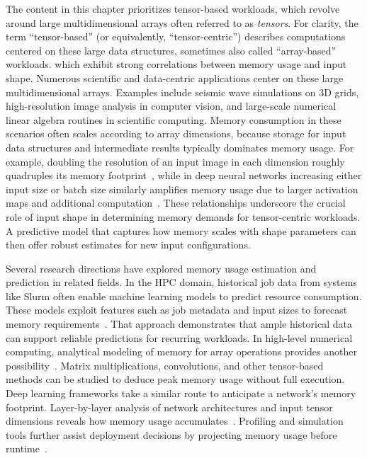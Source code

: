 The content in this chapter prioritizes tensor-based workloads, which revolve around large multidimensional arrays often referred to as \textit{tensors}.
For clarity, the term “tensor-based” (or equivalently, “tensor-centric”) describes computations centered on these large data structures, sometimes also called “array-based” workloads.
which exhibit strong correlations between memory usage and input shape.
Numerous scientific and data-centric applications center on these large multidimensional arrays.
Examples include seismic wave simulations on \ac{3D} grids, high-resolution image analysis in computer vision, and large-scale numerical linear algebra routines in scientific computing.
Memory consumption in these scenarios often scales according to array dimensions, because storage for input data structures and intermediate results typically dominates memory usage.
For example, doubling the resolution of an input image in each dimension roughly quadruples its memory footprint~\cite{stackoverflow_memory_inv}, while in deep neural networks increasing either input size or batch size similarly amplifies memory usage due to larger activation maps and additional computation~\cite{dell_3dunet_memory}.
These relationships underscore the crucial role of input shape in determining memory demands for tensor-centric workloads.
A predictive model that captures how memory scales with shape parameters can then offer robust estimates for new input configurations.

Several research directions have explored memory usage estimation and prediction in related fields.
In the \ac{HPC} domain, historical job data from systems like Slurm often enable machine learning models to predict resource consumption.
These models exploit features such as job metadata and input sizes to forecast memory requirements~\cite{yoo2003slurm}.
That approach demonstrates that ample historical data can support reliable predictions for recurring workloads.
In high-level numerical computing, analytical modeling of memory for array operations provides another possibility~\cite{cornell_memory_workshop}.
Matrix multiplications, convolutions, and other tensor-based methods can be studied to deduce peak memory usage without full execution.
Deep learning frameworks take a similar route to anticipate a network's memory footprint.
Layer-by-layer analysis of network architectures and input tensor dimensions reveals how memory usage accumulates~\cite{gao2020, dell_3dunet_memory}.
Profiling and simulation tools further assist deployment decisions by projecting memory usage before runtime~\cite{tanash2019}.

